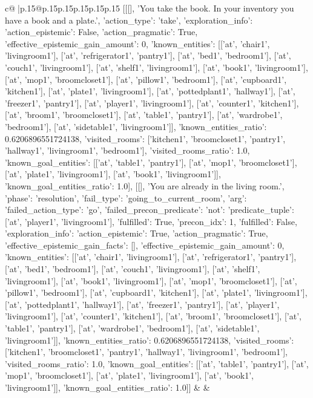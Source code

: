 \documentclass{article}
\begin{document}
{\begin{supertabular}{c@{$\;$}|p{.15\linewidth}@{}p{.15\linewidth}p{.15\linewidth}p{.15\linewidth}p{.15\linewidth}p{.15\linewidth}}
{{{	 [[[], 'You take the book. In your inventory you have a book and a plate.', {'action_type': 'take', 'exploration_info': {'action_epistemic': False, 'action_pragmatic': True, 'effective_epistemic_gain_amount': 0, 'known_entities': [['at', 'chair1', 'livingroom1'], ['at', 'refrigerator1', 'pantry1'], ['at', 'bed1', 'bedroom1'], ['at', 'couch1', 'livingroom1'], ['at', 'shelf1', 'livingroom1'], ['at', 'book1', 'livingroom1'], ['at', 'mop1', 'broomcloset1'], ['at', 'pillow1', 'bedroom1'], ['at', 'cupboard1', 'kitchen1'], ['at', 'plate1', 'livingroom1'], ['at', 'pottedplant1', 'hallway1'], ['at', 'freezer1', 'pantry1'], ['at', 'player1', 'livingroom1'], ['at', 'counter1', 'kitchen1'], ['at', 'broom1', 'broomcloset1'], ['at', 'table1', 'pantry1'], ['at', 'wardrobe1', 'bedroom1'], ['at', 'sidetable1', 'livingroom1']], 'known_entities_ratio': 0.6206896551724138, 'visited_rooms': ['kitchen1', 'broomcloset1', 'pantry1', 'hallway1', 'livingroom1', 'bedroom1'], 'visited_rooms_ratio': 1.0, 'known_goal_entities': [['at', 'table1', 'pantry1'], ['at', 'mop1', 'broomcloset1'], ['at', 'plate1', 'livingroom1'], ['at', 'book1', 'livingroom1']], 'known_goal_entities_ratio': 1.0}}], [[], 'You are already in the living room.', {'phase': 'resolution', 'fail_type': 'going_to_current_room', 'arg': {'failed_action_type': 'go', 'failed_precon_predicate': {'not': {'predicate_tuple': ['at', 'player1', 'livingroom1'], 'fulfilled': True, 'precon_idx': 1}, 'fulfilled': False}}, 'exploration_info': {'action_epistemic': True, 'action_pragmatic': True, 'effective_epistemic_gain_facts': [], 'effective_epistemic_gain_amount': 0, 'known_entities': [['at', 'chair1', 'livingroom1'], ['at', 'refrigerator1', 'pantry1'], ['at', 'bed1', 'bedroom1'], ['at', 'couch1', 'livingroom1'], ['at', 'shelf1', 'livingroom1'], ['at', 'book1', 'livingroom1'], ['at', 'mop1', 'broomcloset1'], ['at', 'pillow1', 'bedroom1'], ['at', 'cupboard1', 'kitchen1'], ['at', 'plate1', 'livingroom1'], ['at', 'pottedplant1', 'hallway1'], ['at', 'freezer1', 'pantry1'], ['at', 'player1', 'livingroom1'], ['at', 'counter1', 'kitchen1'], ['at', 'broom1', 'broomcloset1'], ['at', 'table1', 'pantry1'], ['at', 'wardrobe1', 'bedroom1'], ['at', 'sidetable1', 'livingroom1']], 'known_entities_ratio': 0.6206896551724138, 'visited_rooms': ['kitchen1', 'broomcloset1', 'pantry1', 'hallway1', 'livingroom1', 'bedroom1'], 'visited_rooms_ratio': 1.0, 'known_goal_entities': [['at', 'table1', 'pantry1'], ['at', 'mop1', 'broomcloset1'], ['at', 'plate1', 'livingroom1'], ['at', 'book1', 'livingroom1']], 'known_goal_entities_ratio': 1.0}}]] 
	  } 
	   } 
	   } 
	 & & \\ 
 


\end{supertabular}}
\end{document}

